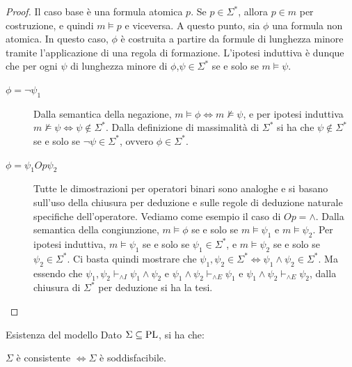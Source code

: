 \begin{proof}
  Il caso base è una formula atomica \(p\). Se \(p\in\Sigma^*\), allora \(p\in m\) per costruzione, e quindi \(m\models p\) e viceversa.
  A questo punto, sia \(\phi\) una formula non atomica. In questo caso, \(\phi\) è costruita a partire da formule di lunghezza minore tramite l'applicazione di una regola di formazione. L'ipotesi induttiva è dunque che per ogni \(\psi\) di lunghezza minore di \(\phi\),\(\psi \in \Sigma^*\) se e solo se \(m\models\psi\).
  \begin{description}
    \item[\(\phi = \neg\psi_1\)] Dalla semantica della negazione, \(m\models \phi \iff m \not\models \psi\), e per ipotesi induttiva \(m\not\models \psi\iff \psi \notin\Sigma^*\). Dalla definizione di massimalità di \(\Sigma^*\) si ha che \(\psi\notin\Sigma^*\) se e solo se \(\neg\psi\in\Sigma^*\), ovvero \(\phi\in\Sigma^*\).
    \item[\(\phi = \psi_1 Op \psi_2\)] Tutte le dimostrazioni per operatori binari sono analoghe e si basano sull'uso della chiusura per deduzione e sulle regole di deduzione naturale specifiche dell'operatore. Vediamo come esempio il caso di \(Op=\land\).
        Dalla semantica della congiunzione, \(m\models \phi\) se e solo se \(m\models \psi_1\) e \(m\models \psi_2\). Per ipotesi induttiva, \(m\models \psi_1\) se e solo se \(\psi_1\in\Sigma^*\), e \(m\models \psi_2\) se e solo se \(\psi_2\in\Sigma^*\). Ci basta quindi mostrare che \(\psi_1,\psi_2 \in \Sigma^*\iff \psi_1\land\psi_2\in\Sigma^*\).
        Ma essendo che \(\psi_1,\psi_2 \vdash_{\land I} \psi_1\land\psi_2\) e \(\psi_1\land\psi_2\vdash_{\land E} \psi_1\) e \(\psi_1\land\psi_2\vdash_{\land E} \psi_2\), dalla chiusura di \(\Sigma^*\) per deduzione si ha la tesi.
  \end{description}
\end{proof}

\begin{lemma}[namedlabel={lem:model-existence}{Esistenza del modello}]{Esistenza del modello}
  Dato \(\Sigma\subseteq\operatorname{PL}\), si ha che:
  
  \(\Sigma\) è consistente \(\iff\Sigma\) è soddisfacibile.
\end{lemma}

